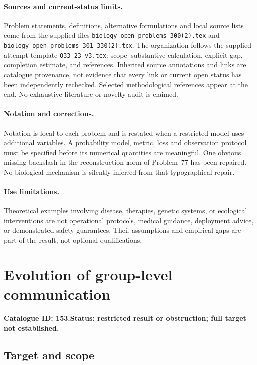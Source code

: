 \documentclass[11pt]{article}
\begin{document}
\paragraph{Sources and current-status limits.}
Problem statements, definitions, alternative formulations and local source lists
come from the supplied files
\texttt{biology\_open\_problems\_300(2).tex} and
\texttt{biology\_open\_problems\_301\_330(2).tex}.
The organization follows the supplied attempt template
\texttt{O33-23\_v3.tex}: scope, substantive calculation, explicit gap,
completion estimate, and references. Inherited source annotations and links are
catalogue provenance, not evidence that every link or current open status has
been independently rechecked. Selected methodological references appear at the
end. No exhaustive literature or novelty audit is claimed.

\paragraph{Notation and corrections.}
Notation is local to each problem and is restated when a restricted model uses
additional variables. A probability model, metric, loss and observation protocol
must be specified before its numerical quantities are meaningful. One obvious
missing backslash in the reconstruction norm of Problem~77 has been repaired.
No biological mechanism is silently inferred from that typographical repair.

\paragraph{Use limitations.}
Theoretical examples involving disease, therapies, genetic systems, or ecological
interventions are not operational protocols, medical guidance, deployment advice,
or demonstrated safety guarantees. Their assumptions and empirical gaps are part
of the result, not optional qualifications.

\setcounter{section}{152}
\section{Evolution of group-level communication}
\label{prob:153}
\noindent\textbf{Catalogue ID: 153.}\quad \textbf{Status: restricted result or obstruction; full target not established.}
\subsection{Target and scope}
\end{document}
